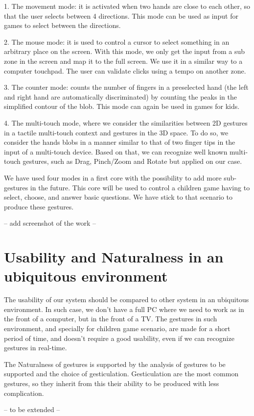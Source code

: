 \documentclass{llncs}
\newcommand\ignore[1]{}
\begin{document}
1. The movement mode:
it is activated when two hands are close to each other, so that the user selects between 4 directions. This mode can be used as input for games to select between the directions.

2. The mouse mode:
it is used to control a cursor to select something in an arbitrary place on the screen. With this mode, we only get the input from a sub zone in the screen and map it to the full screen. We use it in a similar way to a computer touchpad.
The user can validate clicks using a tempo on another zone.

3. The counter mode: counts the number of fingers in a preselected hand (the left and right hand are automatically discriminated) by counting the peaks in the simplified contour of the blob. This mode can again be used in games for kids.

4. The multi-touch mode, where we consider the similarities between 2D gestures in a tactile multi-touch context and gestures in the 3D space. To do so, we consider the hands blobs in a manner similar to that of two finger tips in the input of a multi-touch device. Based on that, we can recognize well known multi-touch gestures, such as Drag, Pinch/Zoom and Rotate but applied on our case.

We have used four modes in a first core with the possibility to add more sub-gestures in the future.
This core will be used to control a children game having to select, choose, and answer basic questions.
We have stick to that scenario to produce these gestures. 

-- add screenshot of the work --

\section{Usability and Naturalness in an ubiquitous environment}

The usability of our system should be compared to other system in an ubiquitous
environment. In such case, we don't have a full PC where we need to work as in
the front of a computer, but in the front of a TV.
The gestures in such environment, and specially for children game scenario,
are made for a short period of time, and doesn't require a good usability,
even if we can recognize gestures in real-time.

The Naturalness of gestures is supported by the analysis of gestures to be
supported and the choice of gesticulation.
Gesticulation are the most common gestures, so they inherit from this their
ability to be produced with less complication.

-- to be extended --

\section{}

\ignore{
Naturalness came from the analysis of gestures used in talk shows.
(gestures used many times means nature gestures)
Reverse thinking.
Usability in the context of RevTV ??
}


\end{document}

